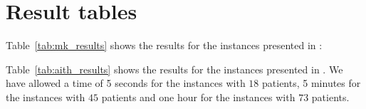 \documentclass[a4paper,11pt]{elsarticle}
\begin{document}
% 
% 

% 




\newpage



\appendix





\section{Result tables}\label{a:Result_Tables}

Table~\ref{tab:mk_results} shows the results for the instances presented in \cite{Mankowska2014}:


Table~\ref{tab:aith_results} shows the results for the instances presented in \cite{AitHaddadene2016}. We have allowed a time of 5 seconds for the instances with $18$ patients, 5 minutes for the instances with $45$ patients and one hour for the instances with $73$ patients.


\end{document}
